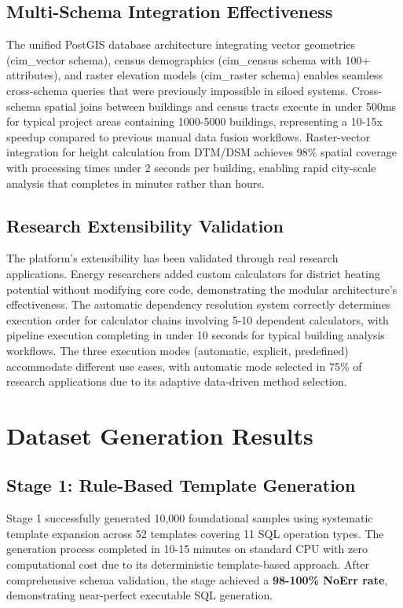 \subsection{Multi-Schema Integration Effectiveness}

The unified PostGIS database architecture integrating vector geometries (cim\_vector schema), census demographics (cim\_census schema with 100+ attributes), and raster elevation models (cim\_raster schema) enables seamless cross-schema queries that were previously impossible in siloed systems. Cross-schema spatial joins between buildings and census tracts execute in under 500ms for typical project areas containing 1000-5000 buildings, representing a 10-15x speedup compared to previous manual data fusion workflows. Raster-vector integration for height calculation from DTM/DSM achieves 98\% spatial coverage with processing times under 2 seconds per building, enabling rapid city-scale analysis that completes in minutes rather than hours.

\subsection{Research Extensibility Validation}

The platform's extensibility has been validated through real research applications. Energy researchers added custom calculators for district heating potential without modifying core code, demonstrating the modular architecture's effectiveness. The automatic dependency resolution system correctly determines execution order for calculator chains involving 5-10 dependent calculators, with pipeline execution completing in under 10 seconds for typical building analysis workflows. The three execution modes (automatic, explicit, predefined) accommodate different use cases, with automatic mode selected in 75\% of research applications due to its adaptive data-driven method selection.



\section{Dataset Generation Results}

\subsection{Stage 1: Rule-Based Template Generation}

Stage 1 successfully generated 10,000 foundational samples using systematic template expansion across 52 templates covering 11 SQL operation types. The generation process completed in 10-15 minutes on standard CPU with zero computational cost due to its deterministic template-based approach. After comprehensive schema validation, the stage achieved a \textbf{98-100\% NoErr rate}, demonstrating near-perfect executable SQL generation.

